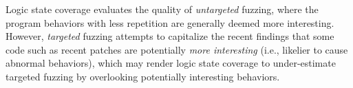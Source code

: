 \documentclass[letterpaper,twocolumn,10pt]{article}
\begin{document}

%

%

%
Logic state coverage evaluates the quality of \emph{untargeted} fuzzing, where
the program behaviors with less repetition are generally deemed more
interesting. 
%
However, \emph{targeted} fuzzing
\cite{aflchurn,chen2020savior,osterlund2020parmesan,lee2024syzrisk} attempts to
capitalize the recent findings \cite{aflchurn,zhai2022ndss,nikolaos2022longvuln}
that some code such as recent patches are potentially \emph{more interesting}
(i.e., likelier to cause abnormal behaviors), which may render logic state
coverage to under-estimate targeted fuzzing by overlooking potentially
interesting behaviors.
\end{document}
